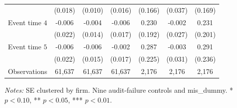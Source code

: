 \documentclass[10pt]{article}
\begin{document}
\begin{minipage}{19cm}
\begin{threeparttable}
\begin{tabular}{l c c c c c c }
 & (0.018) & (0.010) & (0.016) & (0.166) & (0.037) & (0.169) \\
Event time $4$ & -0.006 & -0.004 & -0.006 & 0.230 & -0.002 & 0.231 \\
 & (0.022) & (0.014) & (0.017) & (0.192) & (0.027) & (0.201) \\
Event time $5$ & -0.006 & -0.006 & -0.002 & 0.287 & -0.003 & 0.291 \\
 & (0.022) & (0.015) & (0.017) & (0.225) & (0.031) & (0.236) \\
\midrule
Observations & 61,637 & 61,637 & 61,637 & 2,176 & 2,176 & 2,176 \\
\bottomrule
\end{tabular}
\begin{tablenotes}\fontsize{9}{11}\selectfont
\item \raggedright \fontsize{9}{11}\selectfont \textit{Notes:} SE clustered by firm. Nine audit-failure controls and mis\_dummy. * $p<0.10$, ** $p<0.05$, *** $p<0.01$.
\end{tablenotes}
\end{threeparttable}

\end{minipage}
\end{document}
